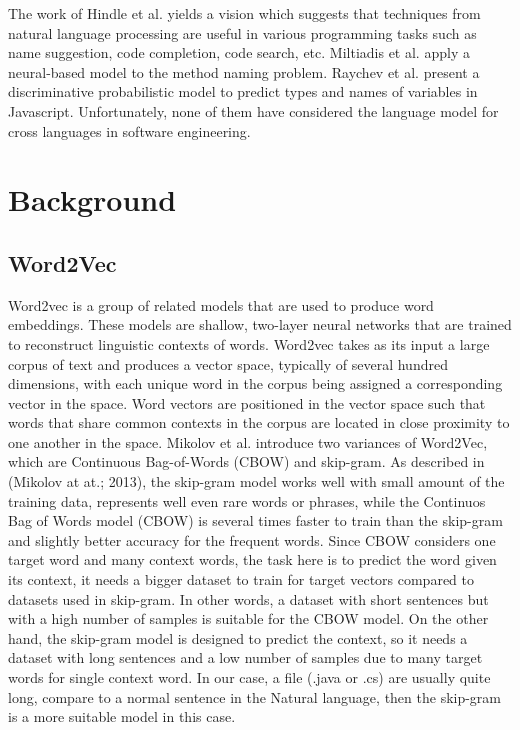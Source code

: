 The work of Hindle et al. \cite{hindle2012naturalness} yields a vision which suggests that techniques from natural language processing are useful in various programming tasks such as name suggestion, code completion, code search, etc. Miltiadis et al. \cite{allamanis2015suggesting} apply a neural-based model to the method naming problem. Raychev et al.\cite{raychev2015predicting} present a discriminative probabilistic model to predict types and names of variables in Javascript. Unfortunately, none of them have considered the language model for cross languages in software engineering.


\section{Background}
\subsection{Word2Vec}

Word2vec is a group of related models that are used to produce word embeddings. These models are shallow, two-layer neural networks that are trained to reconstruct linguistic contexts of words. Word2vec takes as its input a large corpus of text and produces a vector space, typically of several hundred dimensions, with each unique word in the corpus being assigned a corresponding vector in the space. Word vectors are positioned in the vector space such that words that share common contexts in the corpus are located in close proximity to one another in the space. Mikolov et al.\cite{mikolov2013distributed} introduce two variances of Word2Vec, which are Continuous Bag-of-Words (CBOW) and skip-gram. 
As described in (Mikolov at at.; 2013)\cite{mikolov2013distributed}, the skip-gram model works well with small amount of the training data, represents well even rare words or phrases, while the Continuos Bag of Words model (CBOW) is several times faster to train than the skip-gram and slightly better accuracy for the frequent words. Since CBOW considers one target word and many context words, the task here is to predict the word given its context, it needs a bigger dataset to train for target vectors compared to datasets used in skip-gram. In other words, a dataset with short sentences but with a high number of samples is suitable for the CBOW model. On the other hand, the skip-gram model is designed to predict the context, so it needs a dataset with long sentences and a low number of samples due to many target words for single context word. In our case, a file (.java or .cs) are usually quite long, compare to a normal sentence in the Natural language, then the skip-gram is a more suitable model in this case. 



